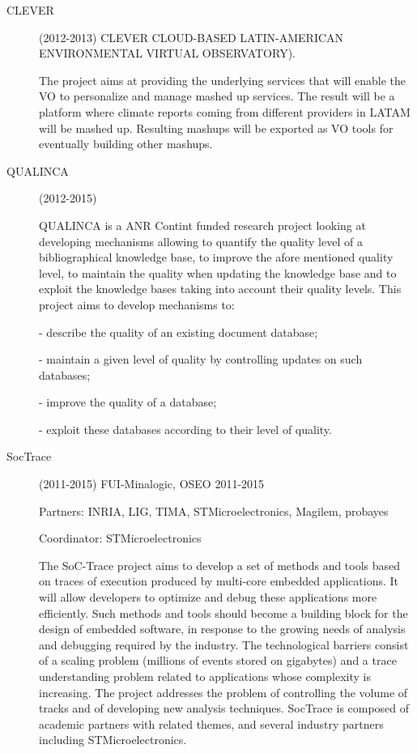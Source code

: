 \begin{description}

\item[CLEVER] (2012-2013)  CLEVER CLOUD-BASED LATIN-AMERICAN ENVIRONMENTAL VIRTUAL OBSERVATORY). 

The project aims at providing the underlying services that will enable the VO to personalize and manage mashed up services. The result will be a platform where climate reports coming from different providers in LATAM will be mashed up. Resulting mashups will be exported as VO tools for eventually building other mashups.

\item[QUALINCA] (2012-2015)

QUALINCA is a ANR Contint funded research project looking at developing mechanisms allowing to quantify the quality level of a bibliographical knowledge base, to improve the afore mentioned quality level, to maintain the quality when updating the knowledge base and to exploit the knowledge bases taking into account their quality levels.
This project aims to develop mechanisms to:

- describe the quality of an existing document database;

- maintain a given level of quality by controlling updates on such databases;

- improve the quality of a database;

- exploit these databases according to their level of quality.


\item[ SocTrace] (2011-2015)  FUI-Minalogic, OSEO 2011-2015

Partners: INRIA, LIG, TIMA, STMicroelectronics, Magilem, probayes

Coordinator: STMicroelectronics

The SoC-Trace project aims to develop a set of methods and tools based on traces of execution produced by multi-core embedded applications. It will allow developers to optimize and debug these applications more efficiently. Such methods and tools should become a building block for the design of embedded software, in response to the growing needs of analysis and debugging required by the industry. The technological barriers consist of a scaling problem (millions of events stored on gigabytes) and a trace understanding problem related to applications whose complexity is increasing. The project addresses the problem of controlling the volume of tracks and of developing new analysis techniques. SocTrace is composed of academic partners with related themes, and several industry partners including STMicroelectronics.

\end{description}


